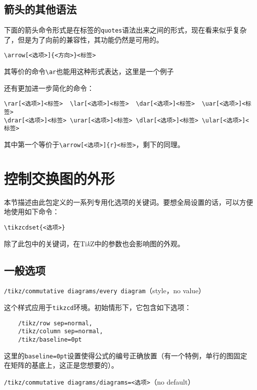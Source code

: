 \documentclass{ctexart}
\begin{document}
\subsection{箭头的其他语法}
下面的箭头命令形式是在标签的\texttt{quotes}语法出来之间的形式，现在看来似乎复杂了，但是为了向前的兼容性，其功能仍然是可用的。
\begin{verbatim}
\arrow[<选项>]{<方向>}<标签>
\end{verbatim}

其等价的命令\verb|\ar|也能用这种形式表达，这里是一个例子
\begin{tcblisting}{}
\end{tcblisting}

还有更加进一步简化的命令：
\begin{verbatim}
\rar[<选项>]<标签>  \lar[<选项>]<标签>  \dar[<选项>]<标签>  \uar[<选项>]<标签>
\drar[<选项>]<标签> \urar[<选项>]<标签> \dlar[<选项>]<标签> \ular[<选项>]<标签>
\end{verbatim}
其中第一个等价于\verb|\arrow[<选项>]{r}<标签>|，剩下的同理。
\section{控制交换图的外形}
本节描述由此包定义的一系列专用化选项的关键词。要想全局设置的话，可以方便地使用如下命令：
\begin{verbatim}
\tikzcdset{<选项>}
\end{verbatim}
除了此包中的关键词，在Ti\emph{k}Z中的参数也会影响图的外观。
\subsection{一般选项}
{\color{red}\texttt{/tikz/commutative diagrams/every diagram}}\hfill （style，no value）

这个样式应用于\texttt{tikzcd}环境。初始情形下，它包含如下选项：
\begin{lstlisting}
    /tikz/row sep=normal,
    /tikz/column sep=normal,
    /tikz/baseline=0pt
\end{lstlisting}

这里的\verb|baseline=0pt|设置使得公式的编号正确放置（有一个特例，单行的图固定在矩阵的基底上，这正是您想要的）。

{\color{red}\texttt{/tikz/commutative diagrams/diagrams=<选项>}}\hfill （no default）
\end{document}
